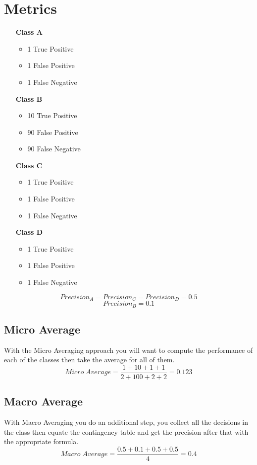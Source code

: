 \documentclass{article}
\begin{document}
\section{Metrics}
\begin{itemize}
	\item[\textbf{Class A}]
		\begin{itemize}
			\item 1 True Positive
			\item 1 False Positive
			\item 1 False Negative 
		\end{itemize}
	\item[\textbf{Class B}]
		\begin{itemize}
			\item 10 True Positive
			\item 90 False Positive
			\item 90 False Negative 
		\end{itemize}
	\item[\textbf{Class C}]
		\begin{itemize}
			\item 1 True Positive
			\item 1 False Positive
			\item 1 False Negative 
		\end{itemize}
	\item[\textbf{Class D}]
		\begin{itemize}
			\item 1 True Positive
			\item 1 False Positive
			\item 1 False Negative 
		\end{itemize}
\end{itemize}
\begin{equation}
	Precision_A = Precision_C = Precision_D = 0.5
\end{equation}
\begin{equation}
	Precision_B = 0.1
\end{equation}
\subsection{Micro Average}
With the Micro Averaging approach you will want to compute the performance of each of the classes then take the average for all of them. 
\begin{equation}
	Micro\;Average=\frac{1+10+1+1}{2+100+2+2}=0.123
\end{equation}
\subsection{Macro Average} 
With Macro Averaging you do an additional step, you collect all the decisions in the class then equate the contingency table and get the precision after that with the appropriate formula.
\begin{equation}
	Macro\;Average=\frac{0.5+0.1+0.5+0.5}{4}=0.4
\end{equation}
\end{document}
